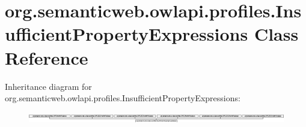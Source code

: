 \hypertarget{classorg_1_1semanticweb_1_1owlapi_1_1profiles_1_1_insufficient_property_expressions}{\section{org.\-semanticweb.\-owlapi.\-profiles.\-Insufficient\-Property\-Expressions Class Reference}
\label{classorg_1_1semanticweb_1_1owlapi_1_1profiles_1_1_insufficient_property_expressions}
}
Inheritance diagram for org.\-semanticweb.\-owlapi.\-profiles.\-Insufficient\-Property\-Expressions\-:\begin{figure}[H]
\begin{center}
\leavevmode
\includegraphics[height=0.487380cm]{classorg_1_1semanticweb_1_1owlapi_1_1profiles_1_1_insufficient_property_expressions}
\end{center}
\end{figure}
